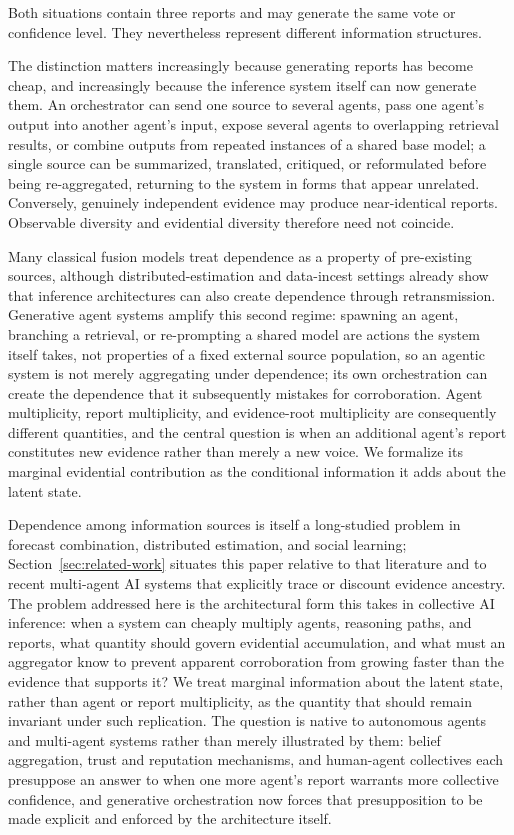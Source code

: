 \documentclass[11pt]{article}
\theoremstyle{definition}
\begin{document}
Both situations contain three reports and may generate the same vote or confidence level. They nevertheless represent different information structures.

The distinction matters increasingly because generating reports has become cheap, and increasingly because the inference system itself can now generate them. An orchestrator can send one source to several agents, pass one agent's output into another agent's input, expose several agents to overlapping retrieval results, or combine outputs from repeated instances of a shared base model; a single source can be summarized, translated, critiqued, or reformulated before being re-aggregated, returning to the system in forms that appear unrelated. Conversely, genuinely independent evidence may produce near-identical reports. Observable diversity and evidential diversity therefore need not coincide.

Many classical fusion models treat dependence as a property of pre-existing sources, although distributed-estimation and data-incest settings already show that inference architectures can also create dependence through retransmission. Generative agent systems amplify this second regime: spawning an agent, branching a retrieval, or re-prompting a shared model are actions the system itself takes, not properties of a fixed external source population, so an agentic system is not merely aggregating under dependence; its own orchestration can create the dependence that it subsequently mistakes for corroboration. Agent multiplicity, report multiplicity, and evidence-root multiplicity are consequently different quantities, and the central question is when an additional agent's report constitutes new evidence rather than merely a new voice. We formalize its marginal evidential contribution as the conditional information it adds about the latent state.

Dependence among information sources is itself a long-studied problem in forecast combination, distributed estimation, and social learning; Section~\ref{sec:related-work} situates this paper relative to that literature and to recent multi-agent AI systems that explicitly trace or discount evidence ancestry. The problem addressed here is the architectural form this takes in collective AI inference: when a system can cheaply multiply agents, reasoning paths, and reports, what quantity should govern evidential accumulation, and what must an aggregator know to prevent apparent corroboration from growing faster than the evidence that supports it? We treat marginal information about the latent state, rather than agent or report multiplicity, as the quantity that should remain invariant under such replication. The question is native to autonomous agents and multi-agent systems rather than merely illustrated by them: belief aggregation, trust and reputation mechanisms, and human-agent collectives each presuppose an answer to when one more agent's report warrants more collective confidence, and generative orchestration now forces that presupposition to be made explicit and enforced by the architecture itself.
\end{document}
